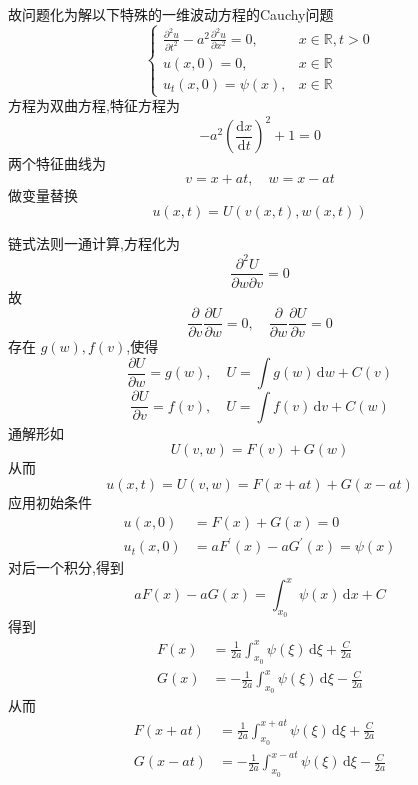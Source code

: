 \documentclass[../../PDE.tex]{subfiles}
\begin{document}
故问题化为解以下特殊的一维波动方程的Cauchy问题 \[
\begin{cases} \frac{\partial ^{2}u}{\partial t^{2}}-a^{2} \frac{\partial ^{2}u}{\partial x^{2}}= 0 ,& x \in \mathbb{R} ,t > 0\\ 
 u\left( x,0 \right)= 0,&x \in \mathbb{R} \\ 
  u_{t}\left( x,0 \right)= \psi \left( x \right),&x \in \mathbb{R}    \end{cases} 
\]方程为双曲方程,特征方程为 \[
-a^{2} \left( \frac{\mathrm{d}x}{\mathrm{d}t} \right)^{2}+ 1= 0  
\] 两个特征曲线为 \[
v =  x+ at,\quad w= x-at
\]做变量替换 \[
u\left( x,t \right)= U\left( v\left( x,t \right),w\left( x,t \right)   \right)  
\]

链式法则一通计算,方程化为 \[
\frac{\partial ^{2}U}{\partial w \partial v}= 0
\]故 \[
\frac{\partial }{\partial v} \frac{\partial U}{\partial w}= 0 ,\quad  \frac{\partial }{\partial w} \frac{\partial U}{\partial v}= 0
\]存在 \(  g\left( w \right),f\left( v \right)    \),使得 \[
\frac{\partial U}{\partial w}= g\left( w \right) , \quad U= \int g\left( w \right)\,\mathrm{d} w+ C\left( v \right)   
\] \[
\frac{\partial U}{\partial v}= f\left( v \right),\quad U= \int f\left( v \right)\,\mathrm{d} v+ C\left( w \right)   
\] 通解形如 \[
U\left( v,w \right)= F\left( v \right)+ G\left( w \right)   
\]从而 \[
u\left( x,t \right)= U\left( v,w \right)= F\left( x+ at \right)+ G\left( x-at \right)    
\]应用初始条件 \[
\begin{aligned}
u\left( x,0 \right)&= F\left( x \right)+ G\left( x \right)= 0\\ 
     u_{t}\left( x,0 \right)& = a F^{\prime} \left( x \right)- a G^{\prime} \left( x \right)= \psi \left( x \right)    
\end{aligned}
\]对后一个积分,得到 \[
a F\left( x \right)- a G\left( x \right)=   \int_{x_0}^{x}\psi \left( x \right) \,\mathrm{d} x+ C
\]得到 \[
\begin{aligned}
    F\left( x \right)&=  \frac{1 }{2a } \int_{x_0}^{x}\psi \left(  \xi \right)\,\mathrm{d}  \xi +  \frac{C }{2a }\\ 
    G\left( x \right)& = -\frac{1 }{2a } \int_{x_0}^{x}\psi \left(  \xi  \right)\,\mathrm{d}  \xi -\frac{C }{2a }    
\end{aligned}  
\]从而 \[
\begin{aligned}
F\left( x+ at \right)&= \frac{1 }{2a }\int_{x_0}^{x+ at}\psi \left(  \xi \right)\,\mathrm{d}  \xi + \frac{C }{2a }     \\ 
 G\left( x-at \right)& = -\frac{1 }{2a } \int_{x_0}^{x- at}\psi \left(  \xi \right)\,\mathrm{d}  \xi  -\frac{C }{2a }    

\end{aligned}\]
\end{document}
